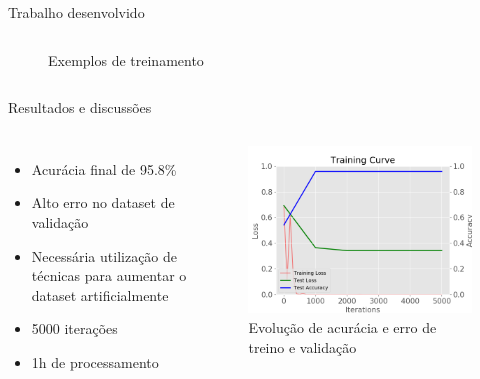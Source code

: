 \documentclass{beamer}
\begin{document}
\begin{frame}{Trabalho desenvolvido}
\begin{columns}
\begin{figure}
            \caption{Exemplos de treinamento}
        \end{figure}
        
    \end{columns}
    
    
    
\end{frame}

\begin{frame}{Resultados e discussões}
    \begin{columns}
            \begin{itemize}
                \item Acurácia final de 95.8\%
                \item Alto erro no dataset de validação
                \item Necessária utilização de técnicas para aumentar o dataset artificialmente
                \item 5000 iterações
                \item 1h de processamento
            \end{itemize}
		
            \begin{figure}
                \includegraphics[width=\linewidth]{img/curve_vgg16.png}
                \caption{Evolução de acurácia e erro de treino e validação} 
            \end{figure}            
            
    \end{columns}
    
\end{frame}
\end{document}
